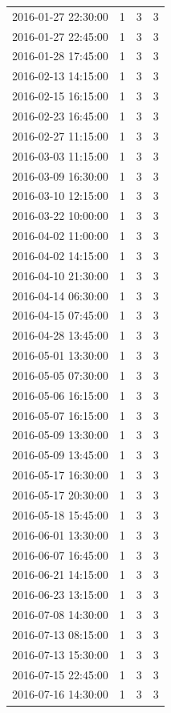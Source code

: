 \begin{tabular}{lrrr}
2016-01-27 22:30:00 & 1 & 3 & 3 \\
2016-01-27 22:45:00 & 1 & 3 & 3 \\
2016-01-28 17:45:00 & 1 & 3 & 3 \\
2016-02-13 14:15:00 & 1 & 3 & 3 \\
2016-02-15 16:15:00 & 1 & 3 & 3 \\
2016-02-23 16:45:00 & 1 & 3 & 3 \\
2016-02-27 11:15:00 & 1 & 3 & 3 \\
2016-03-03 11:15:00 & 1 & 3 & 3 \\
2016-03-09 16:30:00 & 1 & 3 & 3 \\
2016-03-10 12:15:00 & 1 & 3 & 3 \\
2016-03-22 10:00:00 & 1 & 3 & 3 \\
2016-04-02 11:00:00 & 1 & 3 & 3 \\
2016-04-02 14:15:00 & 1 & 3 & 3 \\
2016-04-10 21:30:00 & 1 & 3 & 3 \\
2016-04-14 06:30:00 & 1 & 3 & 3 \\
2016-04-15 07:45:00 & 1 & 3 & 3 \\
2016-04-28 13:45:00 & 1 & 3 & 3 \\
2016-05-01 13:30:00 & 1 & 3 & 3 \\
2016-05-05 07:30:00 & 1 & 3 & 3 \\
2016-05-06 16:15:00 & 1 & 3 & 3 \\
2016-05-07 16:15:00 & 1 & 3 & 3 \\
2016-05-09 13:30:00 & 1 & 3 & 3 \\
2016-05-09 13:45:00 & 1 & 3 & 3 \\
2016-05-17 16:30:00 & 1 & 3 & 3 \\
2016-05-17 20:30:00 & 1 & 3 & 3 \\
2016-05-18 15:45:00 & 1 & 3 & 3 \\
2016-06-01 13:30:00 & 1 & 3 & 3 \\
2016-06-07 16:45:00 & 1 & 3 & 3 \\
2016-06-21 14:15:00 & 1 & 3 & 3 \\
2016-06-23 13:15:00 & 1 & 3 & 3 \\
2016-07-08 14:30:00 & 1 & 3 & 3 \\
2016-07-13 08:15:00 & 1 & 3 & 3 \\
2016-07-13 15:30:00 & 1 & 3 & 3 \\
2016-07-15 22:45:00 & 1 & 3 & 3 \\
2016-07-16 14:30:00 & 1 & 3 & 3 \\

\end{tabular}
